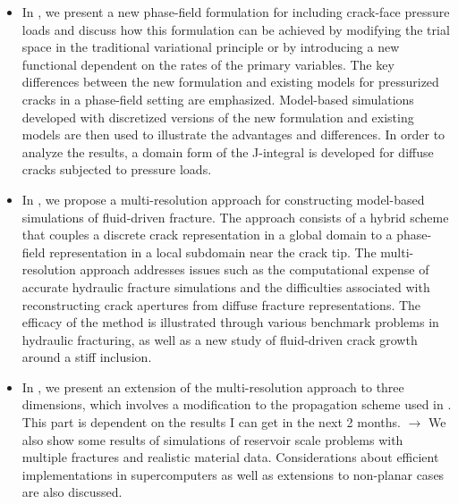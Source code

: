 \begin{itemize}
  \item %
        In , we present a new phase-field formulation for including crack-face pressure loads and discuss how this formulation can be achieved by modifying the trial space in the traditional variational principle or by introducing a new functional dependent on the rates of the primary variables. The key differences between the new formulation and existing models for pressurized cracks in a phase-field setting are emphasized. Model-based simulations developed with discretized versions of the new formulation and existing models are then used to illustrate the advantages and differences. In order to analyze the results, a domain form of the J-integral is developed for diffuse cracks subjected to pressure loads.
  \item %
        In , we propose a multi-resolution approach for constructing model-based simulations of fluid-driven fracture. The approach consists of a hybrid scheme that couples a discrete crack representation in a global domain to a phase-field representation in a local subdomain near the crack tip. The multi-resolution approach addresses issues such as the computational expense of accurate hydraulic fracture simulations and the difficulties associated with reconstructing crack apertures from diffuse fracture representations. The efficacy of the method is illustrated through various benchmark problems in hydraulic fracturing, as well as a new study of fluid-driven crack growth around a stiff inclusion.
  \item %
        In , we present an extension of the multi-resolution approach to three dimensions, which involves a modification to the propagation scheme used in . {\color{red}This part is dependent on the results I can get in the next 2 months. $\rightarrow$ } {\color{blue}We also show some results of simulations of reservoir scale problems with multiple fractures and realistic material data. Considerations about efficient implementations in supercomputers as well as extensions to non-planar cases are also discussed.}

\end{itemize}
